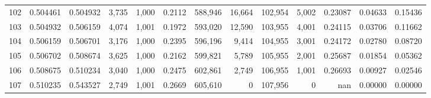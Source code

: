 \begin{tabular}{rrrrrrrrrrrrr}
102 &  0.504461 &  0.504932 &  3,735 &  1,000 &                                     0.2112 &  588,946 &   16,664 &  102,954 &    5,002 &  0.23087 &  0.04633 &  0.15436 \\
103 &  0.504932 &  0.506159 &  4,074 &  1,001 &                                     0.1972 &  593,020 &   12,590 &  103,955 &    4,001 &  0.24115 &  0.03706 &  0.11662 \\
104 &  0.506159 &  0.506701 &  3,176 &  1,000 &                                     0.2395 &  596,196 &    9,414 &  104,955 &    3,001 &  0.24172 &  0.02780 &  0.08720 \\
105 &  0.506702 &  0.508674 &  3,625 &  1,000 &                                     0.2162 &  599,821 &    5,789 &  105,955 &    2,001 &  0.25687 &  0.01854 &  0.05362 \\
106 &  0.508675 &  0.510234 &  3,040 &  1,000 &                                     0.2475 &  602,861 &    2,749 &  106,955 &    1,001 &  0.26693 &  0.00927 &  0.02546 \\
107 &  0.510235 &  0.543527 &  2,749 &  1,001 &                                     0.2669 &  605,610 &        0 &  107,956 &        0 &      nan &  0.00000 &  0.00000 \\
\bottomrule
\end{tabular}
